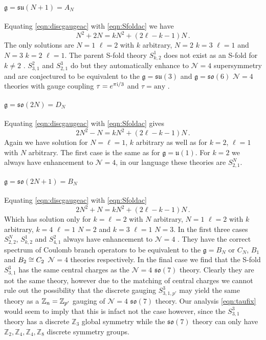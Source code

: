 \documentclass[main.tex]{subfiles}
\begin{document}
\paragraph{$\mathfrak{g}=\mathfrak{su}(N+1)=A_N$} Equating \eqref{eqn:discgaugeac} with \eqref{eqn:Sfoldac} we have
\begin{equation}
N^2+2N=kN^2+(2\ell-k-1)N\,.
\end{equation}
The only solutions are $N=1$ $\ell=2$ with $k$ arbitrary, $N=2$ $k=3$ $\ell=1$ and $N=3$ $k=2$ $\ell=1$. The parent S-fold theory $S^1_{k,2}$ does not exist as an S-fold for $k\neq2$ \cite{Aharony:2016kai}. $S^2_{3,1}$ and $S^3_{2,1}$ do but they automatically enhance to $\mathcal{N}=4$ supersymmetry and are conjectured to be equivalent to the $\mathfrak{g}=\mathfrak{su}(3)$ and $\mathfrak{g}=\mathfrak{so}(6)$ $\mathcal{N}=4$ theories with gauge coupling $\tau=e^{\pi\mathrm{i}/3}$ and $\tau=\text{any}$ \cite{Aharony:2016kai}.
\paragraph{$\mathfrak{g}=\mathfrak{so}(2N)=D_N$}Equating \eqref{eqn:discgaugeac} with \eqref{eqn:Sfoldac} gives
\begin{equation}
2N^2-N=kN^2+(2\ell-k-1)N\,.
\end{equation}
Again we have solution for $N=\ell=1$, $k$ arbitrary as well as for $k=2$, $\ell=1$ with $N$ arbitrary. The first case is the same as for $\mathfrak{g}=\mathfrak{u}(1)$. For $k=2$ we always have enhancement to $\mathcal{N}=4$, in our language these theories are $S^N_{2,1}$.
\paragraph{$\mathfrak{g}=\mathfrak{so}(2N+1)=B_N$}Equating \eqref{eqn:discgaugeac} with \eqref{eqn:Sfoldac}
\begin{equation}
2N^2+N=kN^2+(2\ell-k-1)N\,.
\end{equation}
Which has solution only for $k=\ell=2$ with $N$ arbitrary, $N=1$ $\ell=2$ with $k$ arbitrary, $k=4$ $\ell=1$ $N=2$ and $k=3$ $\ell=1$ $N=3$. In the first three cases $S^N_{2,2}$, $S_{k,2}^1$ and $S_{4,1}^2$ always have enhancement to $\mathcal{N}=4$ \cite{Aharony:2016kai}. They have the correct spectrum of Coulomb branch operators to be equivalent to the $\mathfrak{g}=B_N$ or $C_N$, $B_1$ and $B_2\cong C_2$ $\mathcal{N}=4$ theories respectively. In the final case we find that the S-fold $S^3_{3,1}$ has the same central charges as the $\mathcal{N}=4$ $\mathfrak{so}(7)$ theory. Clearly they are not the same theory, however due to the matching of central charges we cannot rule out the possibility that the discrete gauging $S^3_{3,1,p'}$ may yield the same theory as a $\mathbb{Z}_{n}=\mathbb{Z}_{p'}$ gauging of $\mathcal{N}=4$ $\mathfrak{so}(7)$ theory. Our analysis \eqref{eqn:taufix} would seem to imply that this is infact not the case however, since the $S_{3,1}^3$ theory has a discrete $\mathbb{Z}_3$ global symmetry while the $\mathfrak{so}(7)$ theory can only have $\mathbb{Z}_{2},\mathbb{Z}_{4},\mathbb{Z}_{4},\mathbb{Z}_{8}$ discrete symmetry groups.
\end{document}

